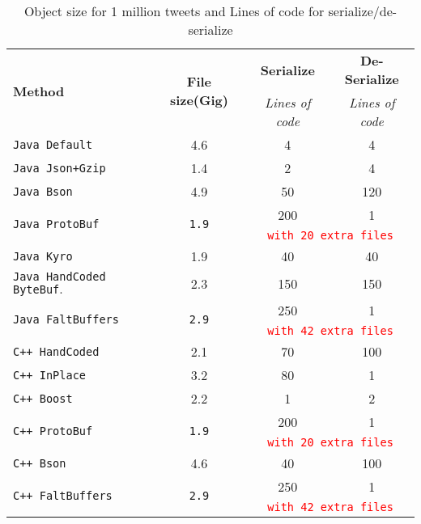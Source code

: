 \begin{table}
	\centering
	\caption{Object size for 1 million tweets and Lines of code for serialize/de-serialize }
	\label{tbl:object_size}
	\begin{adjustbox}{width=\columnwidth,center}	
		
		\begin{tabular}{|l|c|c|c|} \hline
		 \multirow{2}{*}{\textbf{Method}} & \multirow{2}{*}{\textbf{File size(Gig)}} & \textbf{Serialize} &  \textbf{De-Serialize}\\ 
		 &&\textit{Lines of code}& \textit{Lines of code} \\ \hline
			\texttt{Java Default}  & 4.6 & 4  & 4 \\ \hline	
			\texttt{Java Json+Gzip}  & 1.4  & 2 & 4 \\ \hline	
			\texttt{Java Bson}  & 4.9 & 50  & 120 \\ \hline	
			\multirow{2}{*}{\texttt{Java ProtoBuf}}  & \multirow{2}{*}{\texttt{1.9}} & 200 & 1 \\ 
										\cline{3-4}
										&  & \multicolumn{2}{c|}{\textcolor{red}{
												\texttt{with 20 extra files}}}   \\ \hline	
			\texttt{Java Kyro}  & 1.9  & 40 & 40 \\ \hline	
			\texttt{Java HandCoded ByteBuf$.$}  & 2.3  & 150 & 150 \\ \hline	
		    \multirow{2}{*}{\texttt{Java FaltBuffers}}  & \multirow{2}{*}{\texttt{2.9}} & 250 & 1 \\ 
		    				\cline{3-4}
		    				&&\multicolumn{2}{c|}{\textcolor{red}{
		    					\texttt{with 42 extra files}}}   
	    					\\ \hline
		    	
			\texttt{C++ HandCoded}  & 2.1 & 70  & 100 \\ \hline	
			\texttt{C++ InPlace}  & 3.2  & 80 & 1 \\ \hline	
			\texttt{C++ Boost}  & 2.2 & 1 & 2 \\ \hline				
			
			\multirow{2}{*}{\texttt{C++ ProtoBuf}}  & \multirow{2}{*}{\texttt{1.9}} & 200 & 1 \\ 
			\cline{3-4}
			&&\multicolumn{2}{c|}{\textcolor{red}{
					\texttt{with 20 extra files}}}   
			\\ \hline
			
			\texttt{C++ Bson}  & 4.6 & 40 & 100\\ \hline
			\multirow{2}{*}{\texttt{C++ FaltBuffers}}  & \multirow{2}{*}{\texttt{2.9}} & 250  & 1 \\ 
			\cline{3-4}
			&&\multicolumn{2}{c|}{\textcolor{red}{
					\texttt{with 42 extra files}}}   
			\\ \hline
				

\end{tabular}
\end{adjustbox}
\end{table}
